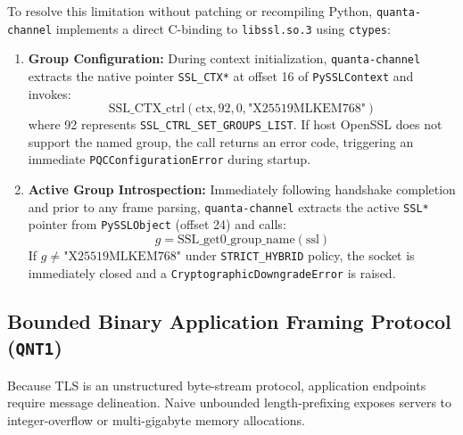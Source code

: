 \documentclass[conference]{IEEEtran}
\begin{document}
To resolve this limitation without patching or recompiling Python, \texttt{quanta-channel} implements a direct C-binding to \texttt{libssl.so.3} using \texttt{ctypes}:
\begin{enumerate}
    \item \textbf{Group Configuration:} During context initialization, \texttt{quanta-channel} extracts the native pointer \texttt{SSL\_CTX*} at offset 16 of \texttt{PySSLContext} and invokes:
    \begin{equation}
        \text{SSL\_CTX\_ctrl}(\text{ctx}, 92, 0, \text{"X25519MLKEM768"})
    \end{equation}
    where 92 represents \texttt{SSL\_CTRL\_SET\_GROUPS\_LIST}. If host OpenSSL does not support the named group, the call returns an error code, triggering an immediate \texttt{PQCConfigurationError} during startup.
    \item \textbf{Active Group Introspection:} Immediately following handshake completion and prior to any frame parsing, \texttt{quanta-channel} extracts the active \texttt{SSL*} pointer from \texttt{PySSLObject} (offset 24) and calls:
    \begin{equation}
        g = \text{SSL\_get0\_group\_name}(\text{ssl})
    \end{equation}
    If $g \neq \text{"X25519MLKEM768"}$ under \texttt{STRICT\_HYBRID} policy, the socket is immediately closed and a \texttt{CryptographicDowngradeError} is raised.
\end{enumerate}

\subsection{Bounded Binary Application Framing Protocol (\texttt{QNT1})}
Because TLS is an unstructured byte-stream protocol, application endpoints require message delineation. Naive unbounded length-prefixing exposes servers to integer-overflow or multi-gigabyte memory allocations.
\end{document}
